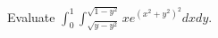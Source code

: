 Evaluate $\displaystyle{\int_{0}^{1} \int_{\sqrt{y-y^2}}^{\sqrt{1-y^2}} x e^{(x^2 + y^2)^2} dx dy}$.
